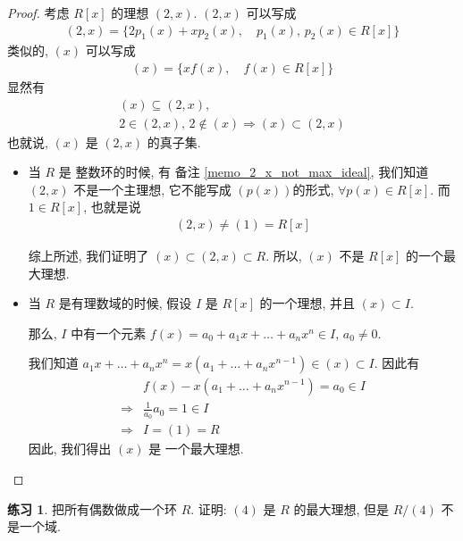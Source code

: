 \documentclass[utf8]{ctexbook}
\theoremstyle{definition}
\newtheorem{exercise}{练习}[section]
\begin{document}
\begin{proof}
考虑 $R[x]$ 的理想 $(2,x)$. $(2,x)$ 可以写成
\begin{align*}
(2,x) = \{  2 p_1 (x) + x p_2 (x), \quad p_1 (x), \, p_2(x) \in R[x] \}
\end{align*}
类似的, $(x)$ 可以写成
\begin{align*}
(x) = \{ x f(x), \quad f(x) \in R[x] \}
\end{align*}
显然有
\begin{align*}
(x) \subseteq (2,x), \\
2 \in (2, x), \, 2 \not \in (x) \Longrightarrow (x) \subset (2,x)
\end{align*}
也就说, $(x)$ 是 $(2,x)$ 的真子集.

\begin{itemize}
\item{当 $R$ 是 整数环的时候, 有 备注 \ref{memo_2_x_not_max_ideal}, 我们知道 $(2,x)$ 不是一个主理想, 它不能写成 $(p(x))$的形式, $\forall p(x) \in R[x]$. 而 $1 \in R[x]$, 也就是说
\begin{align*}
(2, x) \neq (1) = R[x]
\end{align*}

综上所述, 我们证明了 $(x) \subset (2,x) \subset R$. 所以, $(x)$ 不是 $R[x]$ 的一个最大理想.
}
\item{当 $R$ 是有理数域的时候, 假设 $I$ 是 $R[x]$ 的一个理想, 并且 $(x) \subset I$. 

那么, $I$ 中有一个元素 $f(x) = a_0 + a_1 x + \ldots + a_n x^n \in I$, $a_0 \neq 0$. 

我们知道 $a_1 x + \ldots + a_n x^n = x (a_1 + \ldots + a_n x^{n-1}  ) \in (x) \subset I$. 因此有
\begin{align*}
& f(x) - x (a_1 + \ldots + a_n x^{n-1}  ) = a_0 \in I \\
 \Longrightarrow & \frac{1}{a_0} a_0 = 1 \in I \\
 \Longrightarrow & I = (1) = R
\end{align*}
因此, 我们得出 $(x) $ 是 一个最大理想.
}
\end{itemize}
\end{proof}


\begin{exercise}
把所有偶数做成一个环 $R$. 证明: $(4)$ 是 $R$ 的最大理想, 但是 $R/(4)$ 不是一个域.
\end{exercise}
\end{document}
